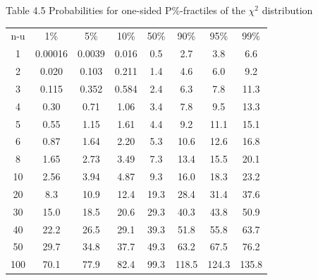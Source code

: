 	\begin{table}
	Table 4.5 Probabilities for one-sided P\%-fractiles of the $\chi^2$ distribution \\
	\centering
	\begin{tabular}{c c c c c c c c}
		\hline 
		n-u & 1\% & 5\% & 10\% & 50\% & 90\% & 95\% & 99\% \\ 

		1 & 0.00016 & 0.0039 & 0.016 & 0.5 & 2.7 & 3.8 & 6.6 \\ 
 
		2 & 0.020 & 0.103 & 0.211 & 1.4 & 4.6 & 6.0 & 9.2 \\ 

		3 & 0.115 & 0.352 & 0.584 & 2.4 & 6.3 & 7.8 & 11.3 \\ 

		4 & 0.30 & 0.71 & 1.06 & 3.4 & 7.8 & 9.5 & 13.3 \\ 
 
		5 & 0.55 & 1.15 & 1.61 & 4.4 & 9.2 & 11.1 & 15.1 \\ 
 
		6 & 0.87 & 1.64 & 2.20 & 5.3 & 10.6 & 12.6 & 16.8 \\ 

		8 & 1.65 & 2.73 & 3.49 & 7.3 & 13.4 & 15.5 & 20.1 \\ 
 
		10 & 2.56 & 3.94 & 4.87 & 9.3 & 16.0 & 18.3 & 23.2 \\ 

		20 & 8.3 & 10.9 & 12.4 & 19.3 & 28.4 & 31.4 & 37.6 \\ 

		30 & 15.0 & 18.5 & 20.6 & 29.3 & 40.3 & 43.8 & 50.9 \\ 

		40 & 22.2 & 26.5 & 29.1 & 39.3 & 51.8 & 55.8 & 63.7 \\ 

		50 & 29.7 & 34.8 & 37.7 & 49.3 & 63.2 & 67.5 & 76.2 \\ 
 
		100 & 70.1 & 77.9 & 82.4 & 99.3 & 118.5 & 124.3 & 135.8 \\ 
		\hline 
	\end{tabular} 	
	\end{table}
	
